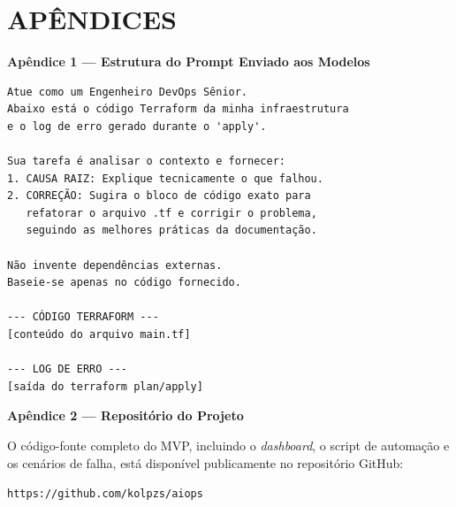 \section*{APÊNDICES}
\thispagestyle{empty}

\textbf{Apêndice 1 --- Estrutura do Prompt Enviado aos Modelos}

\begin{verbatim}
Atue como um Engenheiro DevOps Sênior.
Abaixo está o código Terraform da minha infraestrutura
e o log de erro gerado durante o 'apply'.

Sua tarefa é analisar o contexto e fornecer:
1. CAUSA RAIZ: Explique tecnicamente o que falhou.
2. CORREÇÃO: Sugira o bloco de código exato para
   refatorar o arquivo .tf e corrigir o problema,
   seguindo as melhores práticas da documentação.

Não invente dependências externas.
Baseie-se apenas no código fornecido.

--- CÓDIGO TERRAFORM ---
[conteúdo do arquivo main.tf]

--- LOG DE ERRO ---
[saída do terraform plan/apply]
\end{verbatim}

\vspace{1cm}

\textbf{Apêndice 2 --- Repositório do Projeto}

O código-fonte completo do MVP, incluindo o \textit{dashboard}, o script de automação e os cenários de falha, está disponível publicamente no repositório GitHub:

\texttt{https://github.com/kolpzs/aiops}
